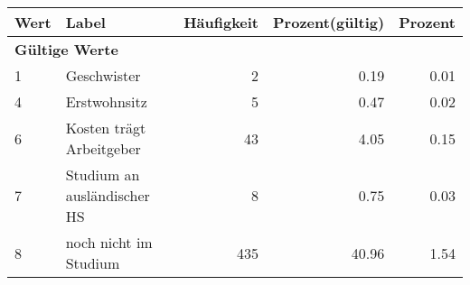      \begin{longtable}{lXrrr}
     \toprule
     \textbf{Wert} & \textbf{Label} & \textbf{Häufigkeit} & \textbf{Prozent(gültig)} & \textbf{Prozent} \\
     \endhead
     \midrule
     \multicolumn{5}{l}{\textbf{Gültige Werte}}\\

     1 &
     \multicolumn{1}{X}{ Geschwister   } &


       \num{2} &
       \num[round-mode=places,round-precision=2]{0.19} &
         \num[round-mode=places,round-precision=2]{0.01} \\

     4 &
     \multicolumn{1}{X}{ Erstwohnsitz   } &


       \num{5} &
       \num[round-mode=places,round-precision=2]{0.47} &
         \num[round-mode=places,round-precision=2]{0.02} \\

     6 &
     \multicolumn{1}{X}{ Kosten trägt Arbeitgeber   } &


       \num{43} &
       \num[round-mode=places,round-precision=2]{4.05} &
         \num[round-mode=places,round-precision=2]{0.15} \\

     7 &
     \multicolumn{1}{X}{ Studium an ausländischer HS   } &


       \num{8} &
       \num[round-mode=places,round-precision=2]{0.75} &
         \num[round-mode=places,round-precision=2]{0.03} \\

     8 &
     \multicolumn{1}{X}{ noch nicht im Studium   } &


       \num{435} &
       \num[round-mode=places,round-precision=2]{40.96} &
         \num[round-mode=places,round-precision=2]{1.54} \\


\end{longtable}
